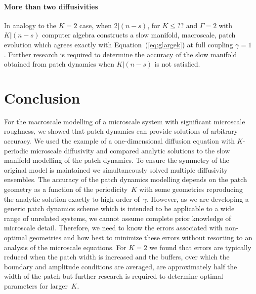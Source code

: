 \documentclass[12pt,a4paper]{article}
\begin{document}
\paragraph{More than two diffusivities}

In analogy to the $K=2$ case, when $2|(n-s)$, for $K\leq ??$ and $\Gamma=2$ with $K|(n-s)$ computer algebra constructs a slow manifold, macroscale, patch evolution which agrees exactly with Equation~(\ref{eq:glargek}) at full coupling $\gamma=1$. Further research is required to determine the accuracy of the slow manifold obtained from patch dynamics when $K|(n-s)$ is not satisfied.

\section{Conclusion}
\label{sec:concl}
For the macroscale modelling of a microscale system with significant microscale roughness, we showed that patch dynamics can provide solutions of arbitrary accuracy. We used the example of a one-dimensional diffusion equation with $K$-periodic microscale diffusivity and compared analytic solutions to the slow manifold modelling of the patch dynamics. To ensure the symmetry of the original model is maintained we simultaneously solved multiple diffusivity ensembles. The accuracy of the patch dynamics modelling depends on the patch geometry as a function of the periodicity~$K$ with some geometries reproducing the analytic solution exactly to high order of~$\gamma$. However, as we are developing a generic patch dynamics scheme which is intended to be applicable to a wide range of unrelated systems, we cannot assume complete prior knowledge of microscale detail. Therefore, we need to know the errors associated with non-optimal geometries and how best to minimize these errors without resorting to an analysis of the microscale equations. For $K=2$ we found that errors are typically reduced when the patch width is increased and the buffers, over which the boundary and amplitude conditions are averaged, are approximately half the width of the  patch but further research is required to determine optimal parameters for larger~$K$. 

 
%
%
\end{document}
